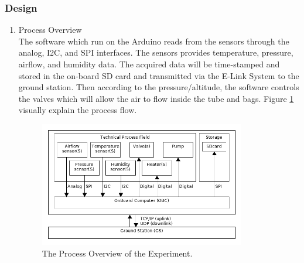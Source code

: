 \subsubsection{Design} \label{sec:4.8.2}
\begin{enumerate}[label=(\alph*)]
\item{Process Overview}\\
The software which run on the Arduino reads from the sensors through the analog, I2C, and SPI interfaces. The sensors provides temperature, pressure, airflow, and humidity data. The acquired data will be time-stamped and stored in the on-board SD card and transmitted via the E-Link System to the ground station. Then according to the pressure/altitude, the software controls the valves which will allow the air to flow inside the tube and bags. Figure \ref{processOverview} visually explain the process flow.

\begin{figure}[H]
    \centering
    \includegraphics[width=0.85\textwidth]{4-experiment-design/img/Process-overview-V0-2.png}
    \caption{The Process Overview of the Experiment.}
    \label{processOverview}
\end{figure}


\end{enumerate}
